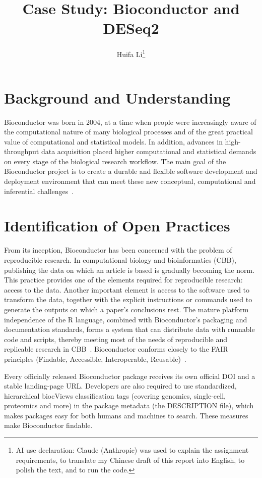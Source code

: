 \documentclass{article}
\title{Case Study: Bioconductor and DESeq2}
\author{Huifa Li\thanks{AI use declaration: Claude (Anthropic) was used to explain the assignment requirements, to translate my Chinese draft of this report into English, to polish the text, and to run the code.}}
\date{}
\begin{document}
\maketitle

\section{Background and Understanding}

Bioconductor was born in 2004, at a time when people were increasingly aware of the computational nature of many biological processes and of the great practical value of computational and statistical models. In addition, advances in high-throughput data acquisition placed higher computational and statistical demands on every stage of the biological research workflow. The main goal of the Bioconductor project is to create a durable and flexible software development and deployment environment that can meet these new conceptual, computational and inferential challenges~\cite{gentleman2004}.

\section{Identification of Open Practices}

From its inception, Bioconductor has been concerned with the problem of reproducible research. In computational biology and bioinformatics (CBB), publishing the data on which an article is based is gradually becoming the norm. This practice provides one of the elements required for reproducible research: access to the data. Another important element is access to the software used to transform the data, together with the explicit instructions or commands used to generate the outputs on which a paper's conclusions rest. The mature platform independence of the R language, combined with Bioconductor's packaging and documentation standards, forms a system that can distribute data with runnable code and scripts, thereby meeting most of the needs of reproducible and replicable research in CBB~\cite{gentleman2004}. Bioconductor conforms closely to the FAIR principles (Findable, Accessible, Interoperable, Reusable)~\cite{wilkinson2016}.

Every officially released Bioconductor package receives its own official DOI and a stable landing-page URL. Developers are also required to use standardized, hierarchical biocViews classification tags (covering genomics, single-cell, proteomics and more) in the package metadata (the DESCRIPTION file), which makes packages easy for both humans and machines to search. These measures make Bioconductor findable.
\end{document}
